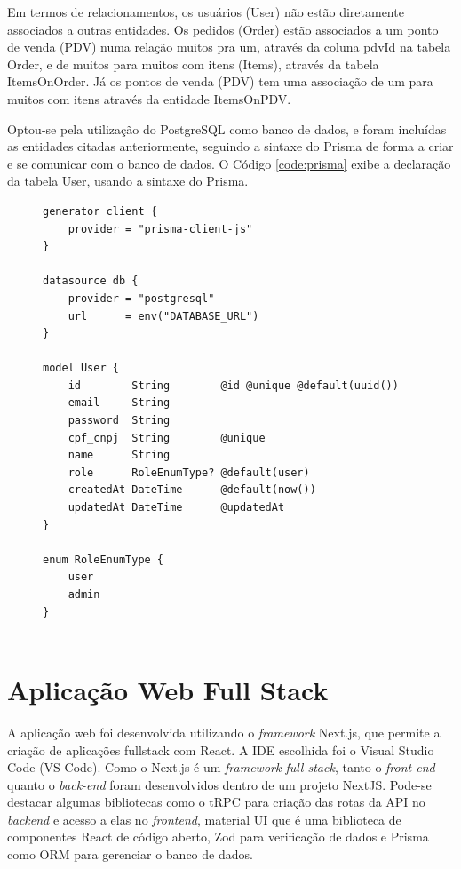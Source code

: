 Em termos de relacionamentos, os usuários (User) não estão diretamente associados a outras entidades. Os pedidos (Order) estão associados a um ponto de venda (PDV) numa relação muitos pra um, através da coluna pdvId na tabela Order, e de muitos para muitos com itens (Items), através da tabela ItemsOnOrder. Já os pontos de venda (PDV) tem uma associação de um para muitos com itens através da entidade ItemsOnPDV.

Optou-se pela utilização do PostgreSQL como banco de dados, e foram incluídas as entidades citadas anteriormente, seguindo a sintaxe do Prisma de forma a criar e se comunicar com o banco de dados. O Código \ref{code:prisma} exibe a declaração da tabela User, usando a sintaxe do Prisma.

\begin{figure}[h]
\begin{lstlisting}[caption={Exemplo de um schema no Prisma.}, label={code:prisma}]
generator client {
    provider = "prisma-client-js"
}

datasource db {
    provider = "postgresql"
    url      = env("DATABASE_URL")
}

model User {
    id        String        @id @unique @default(uuid())
    email     String        
    password  String
    cpf_cnpj  String        @unique
    name      String
    role      RoleEnumType? @default(user)
    createdAt DateTime      @default(now())
    updatedAt DateTime      @updatedAt
}

enum RoleEnumType {
    user
    admin
}
    
\end{lstlisting}

\end{figure}

\section{Aplicação Web Full Stack} \label{cap:fullstack}

A aplicação web foi desenvolvida utilizando o \textit{framework} Next.js, que permite a criação de aplicações fullstack com React. A IDE escolhida foi o Visual Studio Code (VS Code). Como o Next.js é um \textit{framework full-stack}, tanto o \textit{front-end} quanto o \textit{back-end} foram desenvolvidos dentro de um projeto NextJS. Pode-se destacar algumas bibliotecas como o tRPC para criação das rotas da API no \textit{backend} e acesso a elas no \textit{frontend}, material UI que é uma biblioteca de componentes React de código aberto, Zod para verificação de dados e Prisma como \gls{ORM} para gerenciar o banco de dados. 

